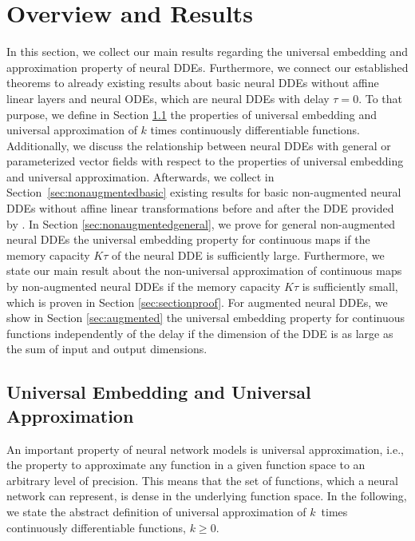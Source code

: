 \documentclass[10pt]{article}
\numberwithin{equation}{section}
\begin{document}
	
	
	
	\section{Overview and Results}
	\label{sec:overview}
	
	In this section, we collect our main results regarding the universal embedding and approximation property of neural DDEs. Furthermore, we connect our established theorems to already existing results about basic neural DDEs without affine linear layers and neural ODEs, which are neural DDEs with delay $\tau = 0$. To that purpose, we define in Section \ref{sec:universal} the properties of universal embedding and universal approximation of $k$ times continuously differentiable functions. Additionally, we discuss the relationship between neural DDEs with general or parameterized vector fields with respect to the properties of universal embedding and universal approximation. Afterwards, we collect in Section~\ref{sec:nonaugmentedbasic} existing results for basic non-augmented neural DDEs without affine linear transformations before and after the DDE provided by \cite{Zhu2021}. In Section \ref{sec:nonaugmentedgeneral}, we prove for general non-augmented neural DDEs the universal embedding property for continuous maps if the memory capacity $K\tau$ of the neural DDE is sufficiently large. Furthermore, we state our main result about the non-universal approximation of continuous maps by non-augmented neural DDEs if the memory capacity $K\tau$ is sufficiently small, which is proven in Section \ref{sec:sectionproof}. For augmented neural DDEs, we show in Section \ref{sec:augmented} the universal embedding property for continuous functions independently of the delay if the dimension of the DDE is as large as the sum of input and output dimensions. 
	
	\subsection{Universal Embedding and Universal Approximation}
	\label{sec:universal}
	
	An important property of neural network models is universal approximation, i.e., the property to approximate any function in a given function space to an arbitrary level of precision. This means that the set of functions, which a neural network can represent, is dense in the underlying function space. In the following, we state the abstract definition of universal approximation of $k$~times continuously differentiable functions, $k \geq 0$.
	
\end{document}
